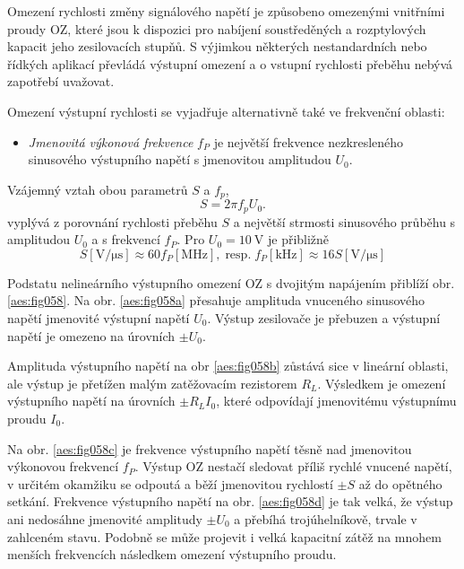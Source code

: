       Omezení rychlosti změny signálového napětí je způsobeno omezenými vnitřními proudy OZ, které
      jsou k dispozici pro nabíjení soustředěných a rozptylových kapacit jeho zesilovacích stupňů.
      S výjimkou některých nestandardních nebo řídkých aplikací převládá výstupní omezení a o
      vstupní rychlosti přeběhu nebývá zapotřebí uvažovat.

      Omezení výstupní rychlosti se vyjadřuje alternativně také ve frekvenční oblasti:
      \begin{itemize}[noitemsep]
        \item \emph{Jmenovitá výkonová frekvence} \(f_P\) je největší frekvence nezkresleného
              sinusového výstupního napětí s jmenovitou amplitudou \(U_0\).        
      \end{itemize}
      Vzájemný vztah obou parametrů \(S\) a \(f_p\),
      \begin{equation}\label{aes:eq038}
        S = 2\pi f_p U_0.
      \end{equation}
      vyplývá z porovnání rychlosti přeběhu \(S\) a největší strmosti sinusového průběhu s
      amplitudou \(U_0\) a s frekvencí \(f_P\). Pro \(U_0 = \qty{10}{\V}\) je přibližně
      \begin{equation*}
        S [\unit{\V/\micro\s}] \approx 60f_P [\unit{\mega\hertz}], \;\text{resp.}\; 
        f_P [\unit{\kilo\hertz}] \approx 16 S [\unit{\V/\micro\s}]
      \end{equation*}

      Podstatu nelineárního výstupního omezení OZ s dvojitým napájením přiblíží obr.
      \ref{aes:fig058}. Na obr. \ref{aes:fig058a} přesahuje amplituda vnuceného sinusového napětí
      jmenovité výstupní napětí \(U_0\). Výstup zesilovače je přebuzen a výstupní napětí je omezeno
      na úrovních \(\pm U_0\).

      Amplituda výstupního napětí na obr \ref{aes:fig058b} zůstává sice v lineární oblasti, ale
      výstup je přetížen malým zatěžovacím rezistorem \(R_L\). Výsledkem je omezení výstupního
      napětí na úrovních \(\pm R_LI_0\), které odpovídají jmenovitému výstupnímu proudu \(I_0\).

      Na obr. \ref{aes:fig058c} je frekvence výstupního napětí těsně nad jmenovitou výkonovou
      frekvencí \(f_P\). Výstup OZ nestačí sledovat příliš rychlé vnucené napětí, v určitém okamžiku
      se odpoutá a běží jmenovitou rychlostí \(\pm S\) až do opětného setkání. Frekvence výstupního
      napětí na obr. \ref{aes:fig058d} je tak velká, že výstup ani nedosáhne jmenovité amplitudy
      \(\pm U_0\) a přebíhá trojúhelníkově, trvale v zahlceném stavu. Podobně se může projevit i
      velká kapacitní zátěž na mnohem menších frekvencích následkem omezení výstupního proudu.

